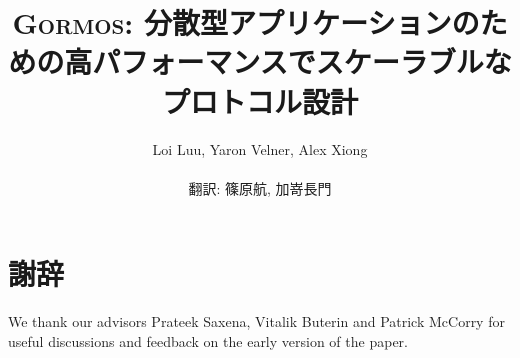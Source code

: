 \documentclass{styles/llncs}
\newcommand{\codename}{{\scshape Gormos}\xspace}
\begin{document}
\title{
  \codename: 分散型アプリケーションのための高パフォーマンスでスケーラブルなプロトコル設計
}
\author{
    Loi Luu, Yaron Velner, Alex Xiong\\
    \\
    \vspace{10pt}
    翻訳: 篠原航, 加嵜長門\\
}


{\def\addcontentsline#1#2#3{}\maketitle}


\setcounter{tocdepth}{2}
\tableofcontents
\newpage



\section{謝辞}
We thank our advisors Prateek Saxena, Vitalik Buterin and Patrick McCorry for useful discussions and feedback on the early version of
the paper.





% 
\end{document}
